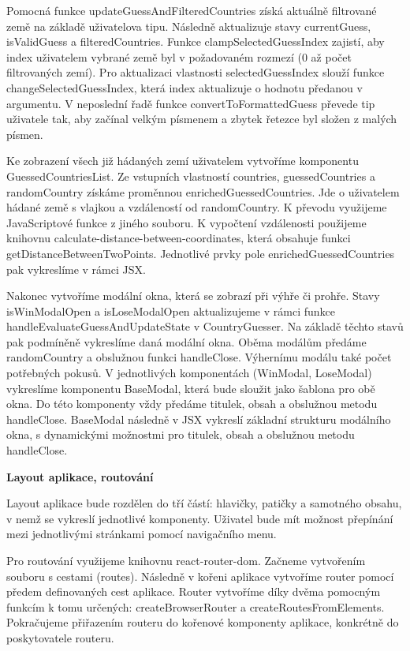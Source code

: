 Pomocná funkce updateGuessAndFilteredCountries získá aktuálně filtrované země na základě uživatelova tipu. Následně aktualizuje stavy currentGuess, isValidGuess a filteredCountries. 
Funkce clampSelectedGuessIndex zajistí, aby index uživatelem vybrané země byl v požadovaném rozmezí (0 až počet filtrovaných zemí). 
Pro aktualizaci vlastnosti selectedGuessIndex slouží funkce changeSelectedGuessIndex, která index aktualizuje o hodnotu předanou v argumentu.
V neposlední řadě funkce convertToFormattedGuess převede tip uživatele tak, aby začínal velkým písmenem a zbytek řetezce byl složen z malých písmen.

Ke zobrazení všech již hádaných zemí uživatelem vytvoříme komponentu GuessedCountriesList. Ze vstupních vlastností countries, guessedCountries a randomCountry získáme proměnnou enrichedGuessedCountries. 
Jde o uživatelem hádané země s vlajkou a vzdáleností od randomCountry. K převodu využijeme JavaScriptové funkce z jiného souboru. 
K vypočtení vzdálenosti použijeme knihovnu calculate-distance-between-coordinates, která obsahuje funkci getDistanceBetweenTwoPoints. Jednotlivé prvky pole enrichedGuessedCountries pak vykreslíme v rámci JSX.

Nakonec vytvoříme modální okna, která se zobrazí při výhře či prohře. Stavy isWinModalOpen a isLoseModalOpen aktualizujeme v rámci funkce handleEvaluateGuessAndUpdateState v CountryGuesser. 
Na základě těchto stavů pak podmíněně vykreslíme daná modální okna. Oběma modálům předáme randomCountry a obslužnou funkci handleClose. Výhernímu modálu také počet potřebných pokusů. 
V jednotlivých komponentách (WinModal, LoseModal) vykreslíme komponentu BaseModal, která bude sloužit jako šablona pro obě okna. Do této komponenty vždy předáme titulek, obsah a obslužnou metodu handleClose. 
BaseModal následně v JSX vykreslí základní strukturu modálního okna, s dynamickými možnostmi pro titulek, obsah a obslužnou metodu handleClose.

\begin{flushleft}
  \textbf{Layout aplikace, routování}
\end{flushleft}

Layout aplikace bude rozdělen do tří částí: hlavičky, patičky a samotného obsahu, v nemž se vykreslí jednotlivé komponenty. Uživatel bude mít možnost přepínání mezi jednotlivými stránkami pomocí navigačního menu.

Pro routování využijeme knihovnu react-router-dom. Začneme vytvořením souboru s cestami (routes). Následně v kořeni aplikace vytvoříme router pomocí předem definovaných cest aplikace. 
Router vytvoříme díky dvěma pomocným funkcím k tomu určených: createBrowserRouter a createRoutesFromElements. Pokračujeme přiřazením routeru do kořenové komponenty aplikace, konkrétně do poskytovatele routeru.

